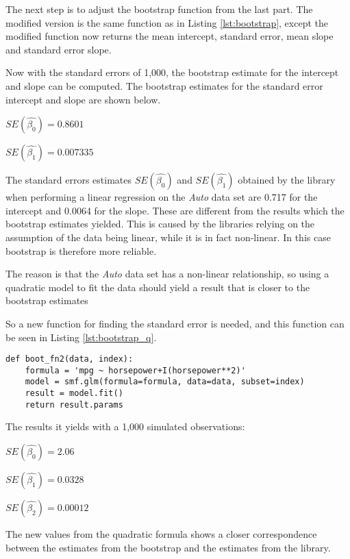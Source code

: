 The next step is to adjust the bootstrap function from the last part. The modified version is the same function as in Listing \ref{lst:bootstrap}, except the modified function now returns the mean intercept, standard error, mean slope and standard error slope.

Now with the standard errors of 1,000, the bootstrap estimate for the intercept and slope can be computed.
The bootstrap estimates for the standard error intercept and slope are shown below.

\begin{center}
	$SE(\hat{\beta_0}) = 0.8601$
\end{center} 
\begin{center}
	$SE(\hat{\beta_1}) = 0.007335$
\end{center}

The standard errors estimates $SE(\hat{\beta_0})$ and $SE(\hat{\beta_1})$ obtained by the library when performing a linear regression on the \emph{Auto} data set are 0.717 for the intercept and 0.0064 for the slope. These are different from the results which the bootstrap estimates yielded. This is caused by the libraries relying on the assumption of the data being linear, while it is in fact non-linear. In this case bootstrap is therefore more reliable. 

The reason is that the \emph{Auto} data set has a non-linear relationship, so using a quadratic model to fit the data should yield a result that is closer to the bootstrap estimates

So a new function for finding the standard error is needed, and this function can be seen in Listing \ref{lst:bootstrap_q}.

\begin{lstlisting}[caption={Function to calculate standard error with a qudratic model}, label=lst:bootstrap_q, mathescape=true]
def boot_fn2(data, index):
	formula = 'mpg ~ horsepower+I(horsepower**2)'
	model = smf.glm(formula=formula, data=data, subset=index)
	result = model.fit()
	return result.params
\end{lstlisting}

The results it yields with a 1,000 simulated observations:

\begin{center}
	$SE(\hat{\beta_0}) = 2.06$
\end{center}
\begin{center}
	$SE(\hat{\beta_1}) = 0.0328$
\end{center}
\begin{center}
	$SE(\hat{\beta_2}) = 0.00012$
\end{center}

The new values from the quadratic formula shows a closer correspondence between the estimates from the bootstrap and the estimates from the library.